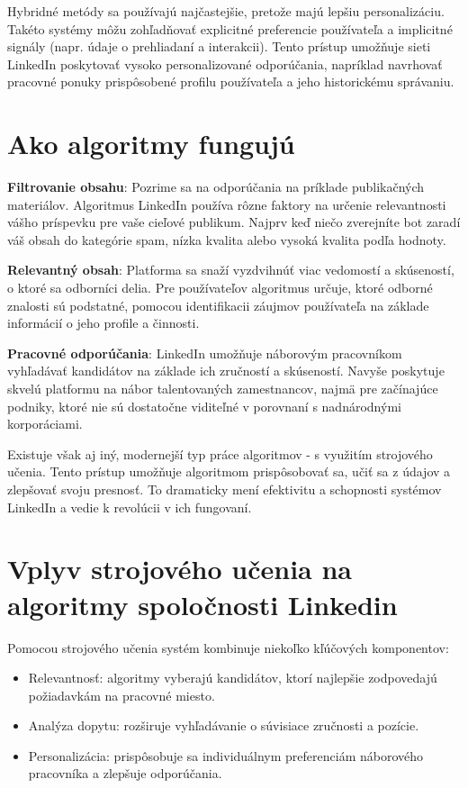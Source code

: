 \documentclass[slovak,a4paper]{coursepaper}
\begin{document}
Hybridné metódy sa používajú najčastejšie, pretože majú lepšiu personalizáciu. Takéto systémy môžu zohľadňovať explicitné preferencie používateľa a implicitné signály (napr. údaje o prehliadaní a interakcii). Tento prístup umožňuje sieti LinkedIn poskytovať vysoko personalizované odporúčania, napríklad navrhovať pracovné ponuky prispôsobené profilu používateľa a jeho historickému správaniu.~\cite{4}

\section{Ako algoritmy fungujú} \label{fungovanie}
\textbf{Filtrovanie obsahu}: Pozrime sa na odporúčania na príklade publikačných materiálov. Algoritmus LinkedIn používa rôzne faktory na určenie relevantnosti vášho príspevku pre vaše cieľové publikum. Najprv keď niečo zverejníte bot zaradí váš obsah do kategórie spam, nízka kvalita alebo vysoká kvalita podľa hodnoty.~\cite{5}

\textbf{Relevantný obsah}: Platforma sa snaží vyzdvihnúť viac vedomostí a skúseností, o ktoré sa odborníci delia. Pre používateľov algoritmus určuje, ktoré odborné znalosti sú podstatné, pomocou identifikacii záujmov používateľa na základe informácií o jeho profile a činnosti.~\cite{6}

\textbf{Pracovné odporúčania}: LinkedIn umožňuje náborovým pracovníkom vyhľadávať kandidátov na základe ich zručností a skúseností. Navyše poskytuje skvelú platformu na nábor talentovaných zamestnancov, najmä pre začínajúce podniky, ktoré nie sú dostatočne viditeľné v porovnaní s nadnárodnými korporáciami.~\cite{7}

Existuje však aj iný, modernejší typ práce algoritmov - s využitím strojového učenia. Tento prístup umožňuje algoritmom prispôsobovať sa, učiť sa z údajov a zlepšovať svoju presnosť. To dramaticky mení efektivitu a schopnosti systémov LinkedIn a vedie k revolúcii v ich fungovaní.

\section{Vplyv strojového učenia na algoritmy spoločnosti Linkedin} \label{strojové učenie}
Pomocou strojového učenia systém kombinuje niekoľko kľúčových komponentov:
\begin{itemize}
	\item Relevantnosť: algoritmy vyberajú kandidátov, ktorí najlepšie zodpovedajú požiadavkám na pracovné miesto.
	\item Analýza dopytu: rozširuje vyhľadávanie o súvisiace zručnosti a pozície.
	\item Personalizácia: prispôsobuje sa individuálnym preferenciám náborového pracovníka a zlepšuje odporúčania.
\end{itemize}
\end{document}
